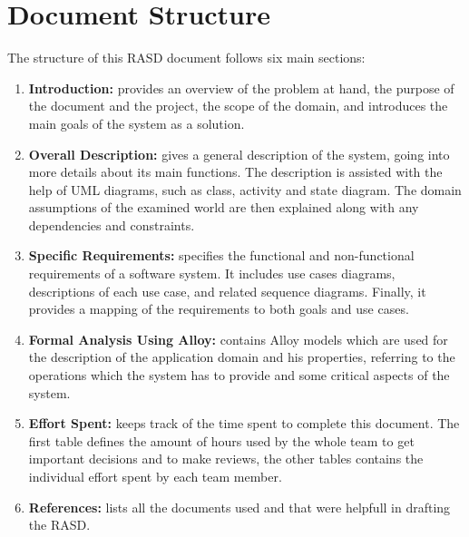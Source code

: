 \section{Document Structure}
The structure of this RASD document follows six main sections:
\begin{enumerate}
    \item \textbf{Introduction:}
          provides an overview of the problem at hand, the purpose of the document and
          the project, the scope of the domain, and introduces the main goals of the system as a solution.

    \item \textbf{Overall Description:}
          gives a general description of the system, going into more details about its main functions.
          The description is assisted with the help of UML diagrams, such as class, activity and state diagram.
          The domain assumptions of the examined world are then explained along with any dependencies and constraints.

    \item \textbf{Specific Requirements:}
          specifies the functional and non-functional requirements of a software system.
          It includes use cases diagrams, descriptions of each use case, and related sequence diagrams.
          Finally, it provides a mapping of the requirements to both goals and use cases.

    \item \textbf{Formal Analysis Using Alloy:}
          contains Alloy models which are used for the description of the application domain and his properties,
          referring to the operations which the system has to provide and some critical aspects of the system.

    \item \textbf{Effort Spent:}
          keeps track of the time spent to complete this document.
          The first table defines the amount of hours used by the whole team to get important decisions and to make reviews,
          the other tables contains the individual effort spent by each team member.

    \item \textbf{References:}
          lists all the documents used and that were helpfull in drafting the RASD.
\end{enumerate}